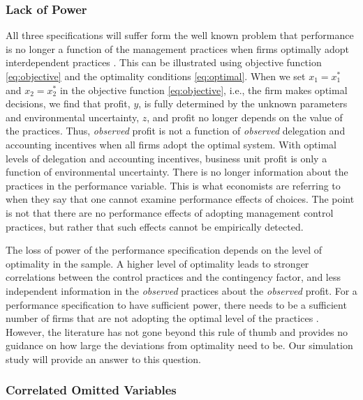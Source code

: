 \documentclass[12pt]{article}
\begin{document}
\subsubsection{Lack of Power}

All three specifications will suffer form the well known problem that performance is no longer a function of the management practices when firms optimally adopt interdependent practices \citep{grabner_management_2013}. This can be illustrated using objective function \eqref{eq:objective} and the optimality conditions \eqref{eq:optimal}. When we set $x_1 = x_1^*$ and $x_2 = x_2^*$ in the objective function  \eqref{eq:objective}, i.e., the firm makes optimal decisions, we find that profit, $y$, is fully determined by the unknown parameters and environmental uncertainty, $z$, and profit no longer depends on the value of the practices. Thus, \textit{observed} profit is not a function of \textit{observed} delegation and accounting incentives when all firms adopt the optimal system. With optimal levels of delegation and accounting incentives, business unit profit is only a function of environmental uncertainty. There is no longer information about the practices in the performance variable. This is what economists are referring to when they say that one cannot examine performance effects of choices. The point is not that there are no performance effects of adopting management control practices, but rather that such effects cannot be empirically detected. 

The loss of power of the performance specification depends on the level of optimality in the sample. A higher level of optimality leads to stronger  correlations between the control practices and the contingency factor, and less independent information in the \textit{observed} practices about the \textit{observed} profit. For a performance specification to have sufficient power, there needs to be a sufficient number of firms that are not adopting the optimal level of the practices \citep{bedford_management_2016, carree_note_2011, hofmann_organizational_2017}. However, the literature has not gone beyond this rule of thumb and provides no guidance on how large the deviations from optimality need to be. Our simulation study will provide an answer to this question.

\subsubsection{Correlated Omitted Variables}
\end{document}
